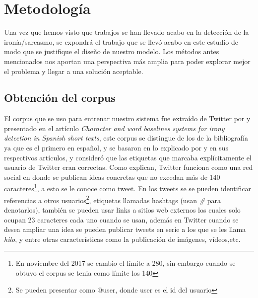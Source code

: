 \chapter{Metodología}\label{cap.metodologia}
	
\par Una vez que hemos visto que trabajos se han llevado acabo en la detección de la ironía/sarcasmo, se expondrá el trabajo que se llevó acabo en este estudio de modo que se justifique el diseño de nuestro modelo. Los métodos antes mencionados nos aportan una perspectiva más amplia para poder explorar mejor el problema y llegar a una solución aceptable.  
\section{Obtención del corpus}
\par El corpus que se uso para entrenar nuestro sistema fue extraído de Twitter por \cite{lopez2016character} y presentado en el artículo \textit{Character and word baselines systems for irony detection in Spanish short texts}, este corpus se distingue de los de la bibliografía ya que es el primero en español, y se basaron en lo explicado por \cite{reyes2012making} y \cite{liebrecht2013perfect} en sus respectivos artículos, y consideró que las etiquetas que marcaba explícitamente el usuario de Twitter eran correctas. Como \cite{lopez2016character} explican, Twitter funciona como una red social en donde se publican ideas concretas que no excedan más de 140 caracteres\footnote[1]{En noviembre del 2017 se cambio el límite a 280, sin embargo cuando se obtuvo el corpus se tenia como límite los 140}, a esto se le conoce como tweet. En los tweets se  se pueden identificar referencias a otros usuarios\footnote{Se pueden presentar como @user, donde user es el id del usuario}, etiquetas llamadas hashtags (usan \textit{\#} para denotarlos), también se pueden usar links a sitios web externos los cuales solo ocupan 23 caracteres cada uno cuando se usan, además en Twitter cuando se desea ampliar una idea se pueden publicar tweets en serie a los que se les llama \textit{hilo}, y entre otras características como la publicación de imágenes, vídeos,etc.


